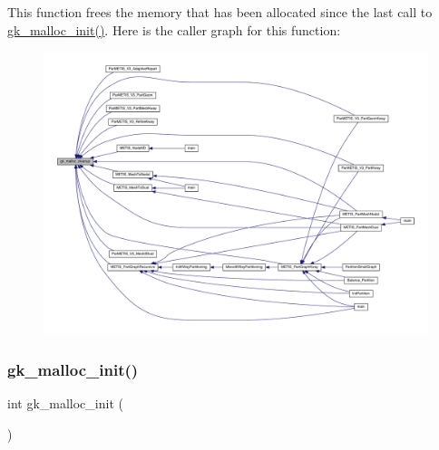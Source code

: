 This function frees the memory that has been allocated since the last call to \hyperlink{a00110_a24633cc1c72a7e92836912c2adcf570a}{gk\+\_\+malloc\+\_\+init()}. Here is the caller graph for this function\+:\nopagebreak
\begin{figure}[H]
\begin{center}
\leavevmode
\includegraphics[width=350pt]{a00110_a47156a22528b5bc8c7c6e9849af34e62_icgraph}
\end{center}
\end{figure}
\mbox{\label{a00110_a24633cc1c72a7e92836912c2adcf570a}} 
\subsubsection{\texorpdfstring{gk\+\_\+malloc\+\_\+init()}{gk\_malloc\_init()}}
{\footnotesize\ttfamily int gk\+\_\+malloc\+\_\+init (\begin{DoxyParamCaption}{ }\end{DoxyParamCaption})}

